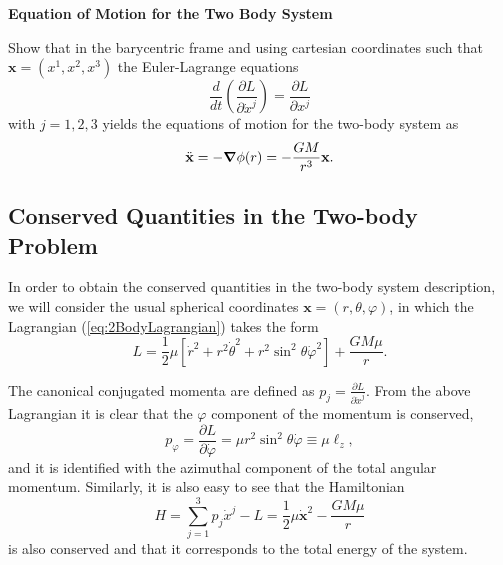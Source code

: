  \vspace{0.5cm}
 \begin{exercise}
 \textbf{Equation of Motion for the Two Body System}
 
 Show that in the barycentric frame and using cartesian coordinates such that $\textbf{x} = (x^1, x^2, x^3)$ the Euler-Lagrange equations
 \begin{equation}
 \frac{d}{dt} \left( \frac{\partial L}{\partial \dot{x}^j} \right) = \frac{\partial L}{\partial x^j}
 \end{equation}
with $j=1,2,3$ yields the equations of motion for the two-body system as
\begin{equation}
\ddot{\textbf{x}} = - {\boldsymbol{\nabla}} \phi (r) = - \frac{GM}{r^3} \textbf{x}. \label{eq:2BodyEoM}
\end{equation}
 \end{exercise}

 \subsection{Conserved Quantities in the Two-body Problem}

In order to obtain the conserved quantities in the two-body system description, we will consider the usual spherical coordinates $\textbf{x} = (r, \theta, \varphi )$, in which the Lagrangian (\ref{eq:2BodyLagrangian}) takes the form
\begin{equation}
 L = \frac{1}{2} \mu \left[ \dot{r}^2 + r^2 \dot{\theta}^2  + r^2 \sin^2 \theta \dot{\varphi}^2 \right] + \frac{GM\mu }{r}.
 \end{equation} 

The canonical conjugated momenta are defined as $p_j = \frac{\partial L}{\partial \dot{x}^j}$. From the above Lagrangian it is clear that the $\varphi$ component of the momentum is conserved,
\begin{equation}
p_\varphi = \frac{\partial L}{\partial \dot{\varphi}} = \mu r^2 \sin^2 \theta \dot{\varphi} \equiv \mu \ell _z, \label{eq:conservedMomentum1}
\end{equation}
and it is identified with the azimuthal component of the total angular momentum. 
Similarly, it is also easy to see that the Hamiltonian 
\begin{equation}
H = \sum_{j=1} ^3 p_j \dot{x}^j - L  = \frac{1}{2} \mu \dot{\textbf{x}}^2 - \frac{GM\mu }{r} \label{eq:2BodyHamiltonian}
\end{equation}
is also conserved and that it corresponds to the total energy of the system.


